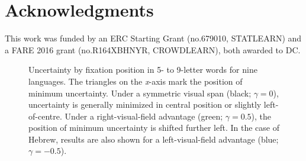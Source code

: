 \documentclass[doc,biblatex,floatsintext]{apa7}
\begin{document}
\section{Acknowledgments}

This work was funded by an ERC Starting Grant (no.\@ 679010, STATLEARN) and a FARE 2016 grant (no.\@ R164XBHNYR, CROWDLEARN), both awarded to DC.

\printbibliography


\appendix
\renewcommand\thefigure{S\arabic{figure}}
\setcounter{figure}{0}
\renewcommand\thetable{S\arabic{table}}
\setcounter{table}{0}


\begin{figure}
\vspace*{2pt}
\caption{Uncertainty by fixation position in 5- to 9-letter words for nine languages. The triangles on the \textit{x}-axis mark the position of minimum uncertainty. Under a symmetric visual span (black; $\gamma=0$), uncertainty is generally minimized in central position or slightly left-of-centre. Under a right-visual-field advantage (green; $\gamma=0.5$), the position of minimum uncertainty is shifted further left. In the case of Hebrew, results are also shown for a left-visual-field advantage (blue; $\gamma=-0.5$).}
\label{supp1}
\end{figure}
\end{document}
